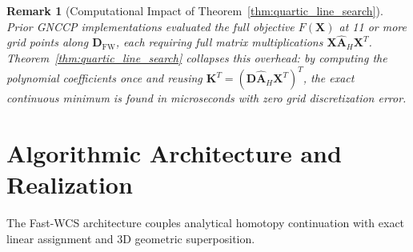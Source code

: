 \documentclass[conference]{IEEEtran}
\newtheorem{remark}{Remark}
\begin{document}
\begin{remark}[Computational Impact of Theorem~\ref{thm:quartic_line_search}]
Prior GNCCP implementations \cite{yang2018algorithm} evaluated the full objective $F(\mathbf{X})$ at 11 or more grid points along $\mathbf{D}_{\text{FW}}$, each requiring full matrix multiplications $\mathbf{X}\hat{\mathbf{A}}_H\mathbf{X}^T$. Theorem~\ref{thm:quartic_line_search} collapses this overhead: by computing the polynomial coefficients once and reusing $\mathbf{K}^T = (\mathbf{D}\hat{\mathbf{A}}_H\mathbf{X}^T)^T$, the exact continuous minimum is found in microseconds with zero grid discretization error.
\end{remark}


\section{Algorithmic Architecture and Realization}
\label{sec:algorithms}

The Fast-WCS architecture couples analytical homotopy continuation with exact linear assignment and 3D geometric superposition.
\end{document}
